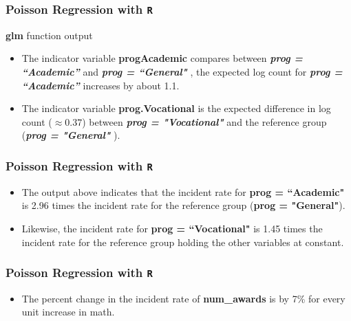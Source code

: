 \documentclass[MASTER.tex]{subfiles}
\begin{document}
\begin{frame}[fragile]
\frametitle{Poisson Regression with \texttt{R}}
\Large 
\textbf{glm} function output
	\begin{itemize}

\item The indicator variable \textbf{progAcademic} compares between \textbf{\textit{prog = “Academic” }}and \textbf{\textit{prog = ``General"}} , the expected log 
count for \textbf{\textit{prog = “Academic” }}increases by about 1.1. \smallskip
\item The indicator variable \textbf{prog.Vocational}  is the expected difference in log count (\(\approx 0.37\)) between 
\textbf{\textit{prog = "Vocational"}} and the reference group (\textbf{\textit{prog = "General"}} ).
\end{itemize}
\end{frame}
\begin{frame}[fragile]
\frametitle{Poisson Regression with \texttt{R}}
	\Large 
	\begin{itemize}
		\item The output above indicates that the incident rate for \textbf{prog = ``Academic"} is 2.96 times the incident rate for the reference group (\textbf{prog = "General"}). 
		\item Likewise, the incident rate for \textbf{prog = ``Vocational"} is 1.45 times the incident rate for the reference group holding the other variables at constant. 
		
	\end{itemize}
	
\end{frame}
\begin{frame}[fragile]
\frametitle{Poisson Regression with \texttt{R}}
	\Large 
	\begin{itemize}
		\item
		The percent change in the incident rate of \textbf{num\_awards} is by 7\% for every unit increase in math. 
	\end{itemize}
\end{frame}
\end{document}
